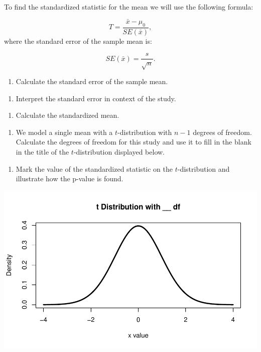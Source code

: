 \documentclass[
]{report}
\providecommand{\tightlist}{%
  \setlength{\itemsep}{0pt}\setlength{\parskip}{0pt}}
\begin{document}
To find the standardized statistic for the mean we will use the following formula:

\[T = \frac{\bar{x} - \mu_0}{SE(\bar{x})},\]
where the standard error of the sample mean is:

\[SE(\bar{x})=\frac{s}{\sqrt{n}}.\]

\begin{enumerate}
\def\labelenumi{\arabic{enumi}.}
\setcounter{enumi}{6}
\tightlist
\item
  Calculate the standard error of the sample mean.
\end{enumerate}

\vspace{0.5in}

\begin{enumerate}
\def\labelenumi{\arabic{enumi}.}
\setcounter{enumi}{7}
\tightlist
\item
  Interpret the standard error in context of the study.
\end{enumerate}

\vspace{1in}

\begin{enumerate}
\def\labelenumi{\arabic{enumi}.}
\setcounter{enumi}{8}
\tightlist
\item
  Calculate the standardized mean.
\end{enumerate}

\vspace{1in}

\begin{enumerate}
\def\labelenumi{\arabic{enumi}.}
\setcounter{enumi}{9}
\tightlist
\item
  We model a single mean with a \(t\)-distribution with \(n-1\) degrees of freedom. Calculate the degrees of freedom for this study and use it to fill in the blank in the title of the \(t\)-distribution displayed below.
\end{enumerate}

\vspace{0.2in}

\begin{enumerate}
\def\labelenumi{\arabic{enumi}.}
\setcounter{enumi}{10}
\tightlist
\item
  Mark the value of the standardized statistic on the \(t\)-distribution and illustrate how the p-value is found.
\end{enumerate}

\begin{center}\includegraphics[width=0.7\linewidth]{06-A13-quantitative_theory_files/figure-latex/tdistmean-1} \end{center}
\newpage
\end{document}
